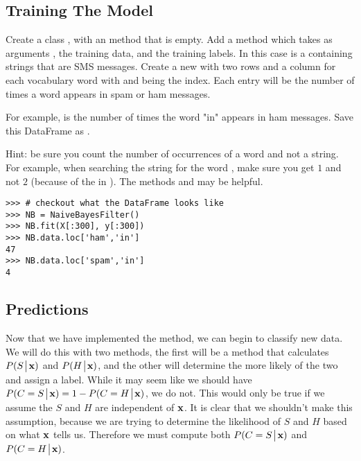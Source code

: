 \subsection*{Training The Model}
\begin{problem}\label{NB:prob_train}
Create a class , with an  method that is empty.
Add a  method which takes as arguments , the training data, and  the training labels.
In this case  is a  containing strings that are SMS messages.
Create a new  with two rows and a column for each vocabulary word 
with  and  being the index. 
Each entry will be the number of times a word appears in spam or ham messages. 

For example,  is the number of times the word "in" appears in ham messages.
Save this DataFrame as .

Hint: be sure you count the number of occurrences of a word and not a string. For example, when searching the string  for the word , make sure you get $1$ and not $2$ (because of the  in ).
The methods  and  may be helpful.

\begin{lstlisting}
>>> # checkout what the DataFrame looks like
>>> NB = NaiveBayesFilter()
>>> NB.fit(X[:300], y[:300])
>>> NB.data.loc['ham','in']
47
>>> NB.data.loc['spam','in']
4
\end{lstlisting}
\end{problem}

\subsection*{Predictions}
Now that we have implemented the  method, we can begin to classify new data.
We will do this with two methods, the first will be a method that calculates $P(S \!\mathrel{\big|}\! \mathbf{x})$ and $P(H \!\mathrel{\big|}\! \mathbf{x})$, and the other will determine the more likely of the two and assign a label.
While it may seem like we should have $P(C=S \!\mathrel{\big|}\! \mathbf{x}) = 1- P(C=H \!\mathrel{\big|}\! \mathbf{x})$, we do not.
This would only be true if we assume the $S$ and $H$ are independent of $\mathbf{x}$.
It is clear that we shouldn't make this assumption, because we are trying to determine the likelihood of $S$ and $H$ based on what $\mathbf{x}$ tells us.
Therefore we must compute both $P(C=S \!\mathrel{\big|}\! \mathbf{x})$ and $P(C=H \!\mathrel{\big|}\! \mathbf{x})$.

